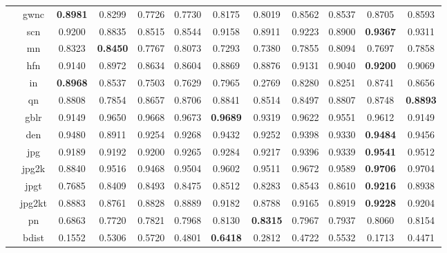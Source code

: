 \documentclass[11pt,a4paper]{article}
\begin{document}
\begin{table}[!htb]
\begin{scriptsize}
\begin{threeparttable}
\begin{tabular}{*{12}{c}}
				& gwnc & \textbf{0.8981} & 0.8299 & \cellcolor{green!25}0.7726 & \cellcolor{green!25}0.7730 & 0.8175 & 0.8019 & 0.8562 & 0.8537 & 0.8705 & 0.8593\\
				& scn & 0.9200 & \cellcolor{green!25}0.8835 & \cellcolor{green!25}0.8515 & \cellcolor{green!25}0.8544 & 0.9158 & 0.8911 & 0.9223 & 0.8900 & \textbf{0.9367} & 0.9311\\
				& mn & 0.8323 & \textbf{0.8450} & 0.7767 & 0.8073 & 0.7293 & 0.7380 & 0.7855 & 0.8094 & 0.7697 & 0.7858\\
				& hfn & 0.9140 & 0.8972 & 0.8634 & 0.8604 & 0.8869 & 0.8876 & 0.9131 & 0.9040 & \textbf{0.9200} & 0.9069\\
				& in & \textbf{0.8968} & 0.8537 & \cellcolor{green!25}0.7503 & \cellcolor{green!25}0.7629 & 0.7965 & \cellcolor{green!25}0.2769 & 0.8280 & 0.8251 & 0.8741 & 0.8656\\
				& qn & 0.8808 & \cellcolor{green!25}0.7854 & 0.8657 & 0.8706 & 0.8841 & 0.8514 & 0.8497 & 0.8807 & 0.8748 & \textbf{0.8893}\\
				& gblr & 0.9149 & \cellcolor{red!25}0.9650 & \cellcolor{red!25}0.9668 & \cellcolor{red!25}0.9673 & \cellcolor{red!25}\textbf{0.9689} & 0.9319 & \cellcolor{red!25}0.9622 & \cellcolor{red!25}0.9551 & \cellcolor{red!25}0.9612 & 0.9149\\
				& den & 0.9480 & \cellcolor{green!25}0.8911 & 0.9254 & 0.9268 & 0.9432 & 0.9252 & 0.9398 & 0.9330 & \textbf{0.9484} & 0.9456\\
				& jpg & \cellcolor{green!25}0.9189 & \cellcolor{green!25}0.9192 & 0.9200 & 0.9265 & 0.9284 & 0.9217 & 0.9396 & 0.9339 & \textbf{0.9541} & 0.9512\\
				& jpg2k & \cellcolor{green!25}0.8840 & 0.9516 & \cellcolor{green!25}0.9468 & \cellcolor{green!25}0.9504 & 0.9602 & 0.9511 & 0.9672 & 0.9589 & \textbf{0.9706} & 0.9704\\
				& jpgt & \cellcolor{green!25}0.7685 & 0.8409 & 0.8493 & 0.8475 & 0.8512 & 0.8283 & 0.8543 & 0.8610 & \textbf{0.9216} & 0.8938\\
				& jpg2kt & 0.8883 & 0.8761 & 0.8828 & 0.8889 & 0.9182 & 0.8788 & 0.9165 & 0.8919 & \textbf{0.9228} & 0.9204\\
				& pn & \cellcolor{green!25}0.6863 & 0.7720 & 0.7821 & 0.7968 & 0.8130 & \textbf{0.8315} & 0.7967 & 0.7937 & 0.8060 & 0.8154\\
				& bdist & \cellcolor{green!25}0.1552 & 0.5306 & 0.5720 & 0.4801 & \cellcolor{red!25}\textbf{0.6418} & 0.2812 & 0.4722 & 0.5532 & \cellcolor{green!25}0.1713 & 0.4471\\

\end{tabular}
\end{threeparttable}
\end{scriptsize}
\end{table}
\end{document}
